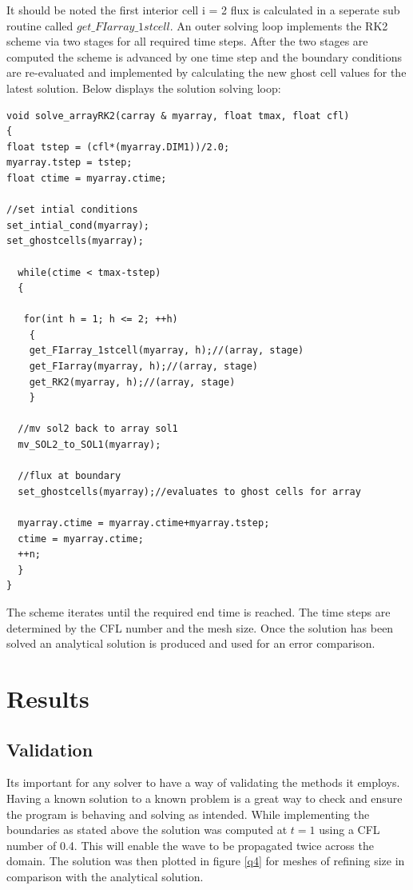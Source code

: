 \documentclass[paper=a4, fontsize=11pt, abstract=on]{scrartcl}
\numberwithin{equation}{section}		%
\numberwithin{figure}{section}			%
\numberwithin{table}{section}				%
\begin{document}
It should be noted the first interior cell i = 2 flux is calculated in a seperate sub routine called $get\_ FIarray\_ 1stcell$.
An outer solving loop implements the RK2 scheme via two stages for all required time steps. After the two stages are computed the scheme is advanced by one time step and the boundary conditions are re-evaluated and implemented by calculating the new ghost cell values for the latest solution. Below displays the solution solving loop:
\begin{lstlisting}
void solve_arrayRK2(carray & myarray, float tmax, float cfl)
{
float tstep = (cfl*(myarray.DIM1))/2.0;
myarray.tstep = tstep;
float ctime = myarray.ctime;

//set intial conditions
set_intial_cond(myarray);
set_ghostcells(myarray);

  while(ctime < tmax-tstep)
  {
  
   for(int h = 1; h <= 2; ++h)
    { 
    get_FIarray_1stcell(myarray, h);//(array, stage)
    get_FIarray(myarray, h);//(array, stage)
    get_RK2(myarray, h);//(array, stage)
    }

  //mv sol2 back to array sol1
  mv_SOL2_to_SOL1(myarray);

  //flux at boundary
  set_ghostcells(myarray);//evaluates to ghost cells for array

  myarray.ctime = myarray.ctime+myarray.tstep;
  ctime = myarray.ctime;
  ++n;
  }
}
\end{lstlisting}
The scheme iterates until the required end time is reached. The time steps are determined by the CFL number and the mesh size. Once the solution has been solved an analytical solution is produced and used for an error comparison.
\newpage
\section{Results}
\subsection{Validation}
Its important for any solver to have a way of validating the methods it employs. Having a known solution to a known problem is a great way to check and ensure the program is behaving and solving as intended. While implementing the boundaries as stated above the solution was computed at $t=1$ using a CFL number of 0.4. This will enable the wave to be propagated twice across the domain. The solution was then plotted in figure \ref{q4} for meshes of refining size in comparison with the analytical solution.
\end{document}
